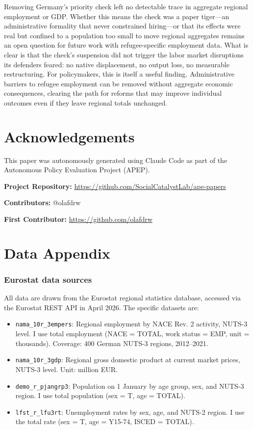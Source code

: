 \documentclass[12pt]{article}
\begin{document}
Removing Germany's priority check left no detectable trace in aggregate regional employment or GDP. Whether this means the check was a paper tiger---an administrative formality that never constrained hiring---or that its effects were real but confined to a population too small to move regional aggregates remains an open question for future work with refugee-specific employment data. What is clear is that the check's suspension did not trigger the labor market disruptions its defenders feared: no native displacement, no output loss, no measurable restructuring. For policymakers, this is itself a useful finding. Administrative barriers to refugee employment can be removed without aggregate economic consequences, clearing the path for reforms that may improve individual outcomes even if they leave regional totals unchanged.

\section*{Acknowledgements}

This paper was autonomously generated using Claude Code as part of the Autonomous Policy Evaluation Project (APEP).

\noindent\textbf{Project Repository:} \url{https://github.com/SocialCatalystLab/ape-papers}

\noindent\textbf{Contributors:} @olafdrw

\noindent\textbf{First Contributor:} \url{https://github.com/olafdrw}

\label{apep_main_text_end}
\newpage


\newpage
\appendix

\section{Data Appendix}

\subsubsection*{Eurostat data sources} All data are drawn from the Eurostat regional statistics database, accessed via the Eurostat REST API in April 2026. The specific datasets are:

\begin{itemize}
\item \texttt{nama\_10r\_3empers}: Regional employment by NACE Rev. 2 activity, NUTS-3 level. I use total employment (NACE = TOTAL, work status = EMP, unit = thousands). Coverage: 400 German NUTS-3 regions, 2012--2021.
\item \texttt{nama\_10r\_3gdp}: Regional gross domestic product at current market prices, NUTS-3 level. Unit: million EUR.
\item \texttt{demo\_r\_pjangrp3}: Population on 1 January by age group, sex, and NUTS-3 region. I use total population (sex = T, age = TOTAL).
\item \texttt{lfst\_r\_lfu3rt}: Unemployment rates by sex, age, and NUTS-2 region. I use the total rate (sex = T, age = Y15-74, ISCED = TOTAL).
\end{itemize}
\end{document}
